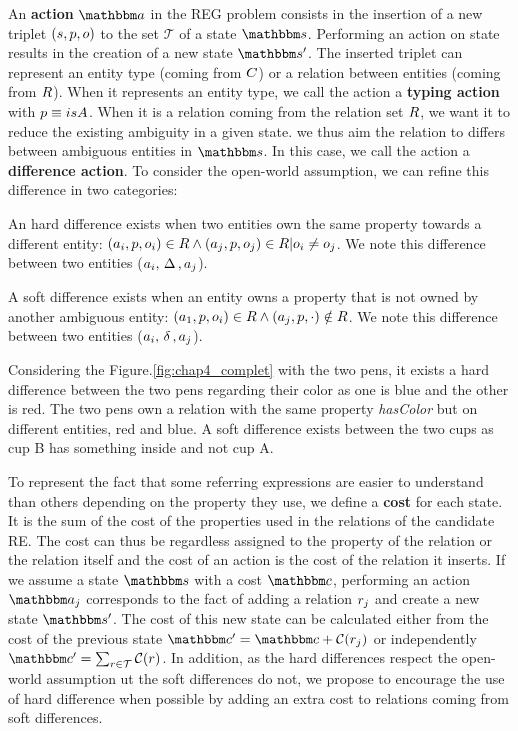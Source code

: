 An \textbf{action} $\action$ in the REG problem consists in the insertion of a new triplet $(s, p, o)$ to the set $\mathcal{T}$ of a state $\state$. Performing an action on state results in the creation of a new state $\state'$. The inserted triplet can represent an entity type (coming from $C$) or a relation between entities (coming from $R$). When it represents an entity type, we call the action a \textbf{typing action} with $p \equiv isA$. When it is a relation coming from the relation set $R$, we want it to reduce the existing ambiguity in a given state. we thus aim the relation to differs between ambiguous entities in $\state$. In this case, we call the action a \textbf{difference action}. To consider the open-world assumption, we can refine this difference in two categories:

\begin{definition}
An hard difference exists when two entities own the same property towards a different entity: $(a_i, p, o_i) \in R \land (a_j, p, o_j) \in R | o_i \neq o_j$. We note this difference between two entities ($a_i, \,\Delta\,, a_j$).
\end{definition}

\begin{definition}
A soft difference exists when an entity owns a property that is not owned by another ambiguous entity: $(a_1, p, o_i) \in R \land (a_j, p, \cdot) \notin R$. We note this difference between two entities ($a_i, \,\delta\,, a_j$).
\end{definition}

Considering the Figure.\ref{fig:chap4_complet} with the two pens, it exists a hard difference between the two pens regarding their color as one is blue and the other is red. The two pens own a relation with the same property \textit{hasColor} but on different entities, red and blue. A soft difference exists between the two cups as cup B has something inside and not cup A.

To represent the fact that some referring expressions are easier to understand than others depending on the property they use, we define a \textbf{cost} for each state. It is the sum of the cost of the properties used in the relations of the candidate RE. The cost can thus be regardless assigned to the property of the relation or the relation itself and the cost of an action is the cost of the relation it inserts. If we assume a state $\state$ with a cost $\cost$, performing an action $\action_j$ corresponds to the fact of adding a relation $r_j$ and create a new state $\state'$. The cost of this new state can be calculated either from the cost of the previous state $\cost' = \cost + \costfunc(\relation_j)$ or independently $\cost' = \sum_{\relation \in \mathcal{T}} \costfunc(\relation)$. In addition, as the hard differences respect the open-world assumption ut the soft differences do not, we propose to encourage the use of hard difference when possible by adding an extra cost to relations coming from soft differences.


